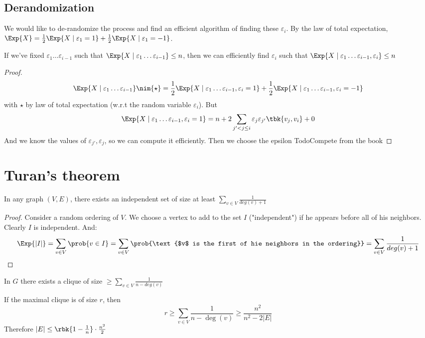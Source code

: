 \documentclass[a4paper, 11pt, oneside]{book}
\begin{document}
\subsection{Derandomization}
We would like to de-randomize the process and find an efficient algorithm of finding these $\varepsilon_i$. By the law of total expectation, $\Exp{X} = \frac12\Exp{X\mid \varepsilon_1 = 1} + \frac12\Exp{X\mid \varepsilon_1 = -1}$.
\begin{claim}
	If we've fixed $\varepsilon_1\ldots \varepsilon_{i-1}$ such that $\Exp{X\mid \varepsilon_1\ldots\varepsilon_{i-1}}\le n$, then we can efficiently find $\varepsilon_i$ such that $\Exp{X\mid \varepsilon_1\ldots\varepsilon_{i-1}, \varepsilon_i}\le n$
\end{claim}
\begin{proof}
	\[
	\Exp{X\mid \varepsilon_1\ldots\varepsilon_{i-1}} \nim{\star}= \frac12\Exp{X\mid \varepsilon_1\ldots\varepsilon_{i-1},\varepsilon_i = 1} + \frac12\Exp{X\mid \varepsilon_1\ldots\varepsilon_{i-1},\varepsilon_i = -1}
	\]
	with $\star$ by law of total expectation (w.r.t the random variable $\varepsilon_i$). But
	\[
	\Exp{X\mid \varepsilon_1\ldots\varepsilon_{i-1},\varepsilon_i = 1} = n + 2\sum_{j'<j \le i}\varepsilon_{j}\varepsilon_{j'}\tbk{v_j,v_i} + 0
	\]
	And we know the values of $\varepsilon_{j'},\varepsilon_j$, so we can compute it efficiently. Then we choose the epsilon Todo{Compete from the book}
\end{proof}
\section{Turan's theorem}
\begin{thm}
	In any graph $(V,E)$, there exists an independent set of size at least $\sum_{v\in V}\frac{1}{deg(v) + 1}$
\end{thm}
\begin{proof}
	Consider a random ordering of $V$. We choose a vertex to add to the set $I$ ("independent") if he appears before all of his neighbors. Clearly $I$ is independent. And:
	\[
	\Exp{|I|} = \sum_{v\in V}\prob{v\in I} = \sum_{v\in V}\prob{\text{$v$ is the first of hie neighbors in the ordering}} = \sum_{v\in V}\frac{1}{deg(v) +1}
	\]
\end{proof}
\begin{cor}
	In $G$ there exists a clique of size $\ge \sum_{v\in V}\frac{1}{n-deg(v)}$
\end{cor}
\begin{thm}
	[Tur\a'an] If the maximal clique is of size $r$, then \[
	r\ge \sum_{v\in V}\frac{1}{n-\deg(v)} \ge \frac{n^2}{n^2-2|E|}
	\]
	Therefore $|E| \le \rbk{1-\frac{1}{n}}\cdot\frac{n^2}{2}$
\end{thm}
\end{document}
